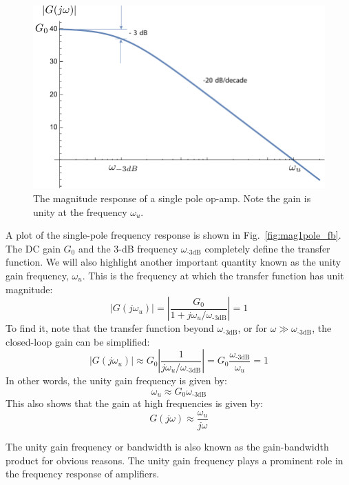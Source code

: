 \begin{figure}[tb]
\begin{center}
\includegraphics[width=.7\columnwidth]{mag1pole}
\end{center}
\caption{The magnitude response of a single pole op-amp.  Note the gain is unity at the frequency $\omega_u$.} \label{fig:mag1pole}
\end{figure}

A plot of the single-pole frequency response is shown in Fig.~\ref{fig:mag1pole_fb}.  The DC gain $G_0$ and the 3-dB frequency $\omega_{\text{-3dB}}$ completely define the transfer function.  We will also highlight another important quantity known as the unity gain frequency, $\omega_u$.  This is the frequency at which the transfer function has unit magnitude:
%
\begin{equation}
	|G(j\omega_u )| = \left| 
		\frac{G_0}{1 + j\omega_u/\omega_{\text{-3dB}}}
					\right| = 1
\end{equation}
%
To find it, note that the transfer function beyond $\omega_{\text{-3dB}}$, or for $\omega \gg \omega_{\text{-3dB}}$, the closed-loop gain can be simplified:
%
\begin{equation}
	|G(j\omega_u )| \approx G_0 \left| 
		\frac{1}{j\omega_u/\omega_{\text{-3dB}}}
					\right| = G_0  \frac{\omega_{\text{-3dB}}}{\omega_u}  = 1 
\end{equation}
%
In other words, the unity gain frequency is given by:
%
\begin{equation}
	\omega_u \approx G_0 \omega_{\text{-3dB}}
\end{equation}  
%
This also shows that the gain at high frequencies is given by:
%
\begin{equation}
	G(j\omega ) \approx \frac{{{\omega_u}}}{{j\omega }}
\end{equation}
%

The unity gain frequency or bandwidth is also known as the gain-bandwidth product for obvious reasons.   The unity gain frequency plays a prominent role in the frequency response of amplifiers.
 


